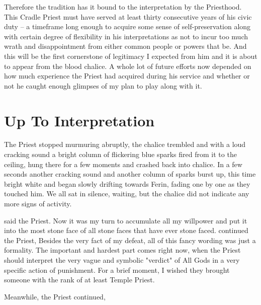 Therefore the tradition has it bound to the interpretation by the Priesthood. This Cradle Priest must have served at least thirty consecutive years of his civic duty -- a timeframe long enough to acquire some sense of self-preservation along with certain degree of flexibility in his interpretations as not to incur too much wrath and disappointment from either common people or powers that be. And this will be the first cornerstone of legitimacy I expected from him and it is about to appear from the blood chalice. A whole lot of future efforts now depended on how much experience the Priest had acquired during his service and whether or not he caught enough glimpses of my plan to play along with it.

\section{Up To Interpretation}

The Priest stopped murmuring abruptly, the chalice trembled and with a loud cracking sound a bright column of flickering blue sparks fired from it to the ceiling, hung there for a few moments and crashed back into chalice. In a few seconds another cracking sound and another column of sparks burst up, this time bright white and began slowly drifting towards Ferin, fading one by one as they touched him. We all sat in silence, waiting, but the chalice did not indicate any more signs of activity.

 said the Priest. Now it was my turn to accumulate all my willpower and put it into the most stone face of all stone faces that have ever stone faced.  continued the Priest,  Besides the very fact of my defeat, all of this fancy wording was just a formality. The important and hardest part comes right now, when the Priest should interpret the very vague and symbolic "verdict" of All Gods in a very specific action of punishment. For a brief moment, I wished they brought someone with the rank of at least Temple Priest.

Meanwhile, the Priest continued, 

